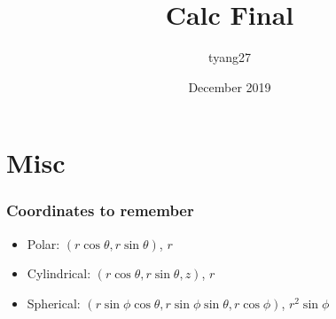 \documentclass[8pt]{report}
\title{Calc Final}
\author{tyang27}
\date{December 2019}
\begin{document}
\maketitle





\section*{Misc}
\subsubsection{Coordinates to remember}
\begin{itemize}
    \item Polar: $(r\cos\theta, r\sin\theta)$, $r$
    \item Cylindrical: $(r\cos\theta, r\sin\theta, z)$, $r$
    \item Spherical: $(r\sin\phi\cos\theta, r\sin\phi\sin\theta, r\cos\phi)$, $r^2\sin\phi$
\end{itemize}{}
\end{document}
